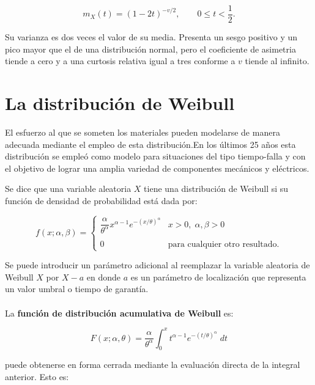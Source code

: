 \begin{tcolorbox}
    $$m_X(t)=(1-2t)^{-v/2},\qquad 0\leq t<\dfrac{1}{2}.$$
\end{tcolorbox}

Su varianza es dos veces el valor de su media. Presenta un sesgo positivo y un pico mayor que el de una distribución normal, pero el coeficiente de asimetria tiende a cero y a una curtosis relativa igual a tres conforme a $v$ tiende al infinito.

\section{La distribución de Weibull}
El esfuerzo al que se someten los materiales pueden modelarse de manera adecuada mediante el empleo de esta distribución.En los últimos 25 años esta distribución se empleó como modelo para situaciones del tipo tiempo-falla y con el objetivo de lograr una amplia variedad de componentes mecánicos y eléctricos.

\begin{tcolorbox}
    \begin{def.}
	Se dice que una variable aleatoria $X$ tiene una distribución de Weibull si su función de densidad de probabilidad está dada por:

	$$f(x;\alpha,\beta)=\left\{\begin{array}{ll}
		\dfrac{\alpha}{\theta^\alpha}x^{\alpha-1}e^{-(x/\theta)^\alpha} & x>0,\; \alpha,\beta>0\\\\
		0 & \mbox{para cualquier otro resultado.}
	\end{array}\right.$$

    \end{def.}
\end{tcolorbox}

Se puede introducir un parámetro adicional al reemplazar la variable aleatoria de Weibull $X$ por $X-a$ en donde $a$ es un parámetro de localización que representa un valor umbral o tiempo de garantía.\\\\

La \textbf{función de distribución acumulativa de Weibull} es:

\begin{tcolorbox}
    $$F(x;\alpha,\theta) = \dfrac{\alpha}{\theta^\alpha}\int_0^x t^{\alpha-1}e^{-(t/\theta)^\alpha}\; dt$$
\end{tcolorbox}

puede obtenerse en forma cerrada mediante la evaluación directa de la integral anterior. Esto es:


